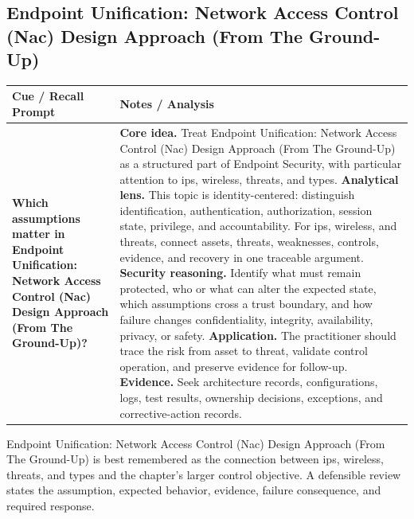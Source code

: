 \documentclass[11pt]{article}
\newcommand{\CornellHeader}{%
\rowcolor{Navy}\color{white}\bfseries Cue / Recall Prompt & \color{white}\bfseries Notes / Analysis\\\hline}
\newcommand{\CornellRow}[2]{%
\cellcolor{CueGray}\RaggedRight\textbf{#1} & \RaggedRight #2\\\hline}
\begin{document}
\subsection*{Endpoint Unification: Network Access Control (Nac) Design Approach (From The Ground-Up)}
\begin{longtable}{>{\RaggedRight\arraybackslash}p{}|>{\RaggedRight\arraybackslash}p{}}
\CornellHeader
\CornellRow{Which assumptions matter in Endpoint Unification: Network Access Control (Nac) Design Approach (From The Ground-Up)?}{\textbf{Core idea.} Treat Endpoint Unification: Network Access Control (Nac) Design Approach (From The Ground-Up) as a structured part of Endpoint Security, with particular attention to ips, wireless, threats, and types. \textbf{Analytical lens.} This topic is identity-centered: distinguish identification, authentication, authorization, session state, privilege, and accountability. For ips, wireless, and threats, connect assets, threats, weaknesses, controls, evidence, and recovery in one traceable argument. \textbf{Security reasoning.} Identify what must remain protected, who or what can alter the expected state, which assumptions cross a trust boundary, and how failure changes confidentiality, integrity, availability, privacy, or safety. \textbf{Application.} The practitioner should trace the risk from asset to threat, validate control operation, and preserve evidence for follow-up. \textbf{Evidence.} Seek architecture records, configurations, logs, test results, ownership decisions, exceptions, and corrective-action records.}
\end{longtable}
\begin{topicsummary}
Endpoint Unification: Network Access Control (Nac) Design Approach (From The Ground-Up) is best remembered as the connection between ips, wireless, threats, and types and the chapter's larger control objective. A defensible review states the assumption, expected behavior, evidence, failure consequence, and required response.
\end{topicsummary}
\end{document}
